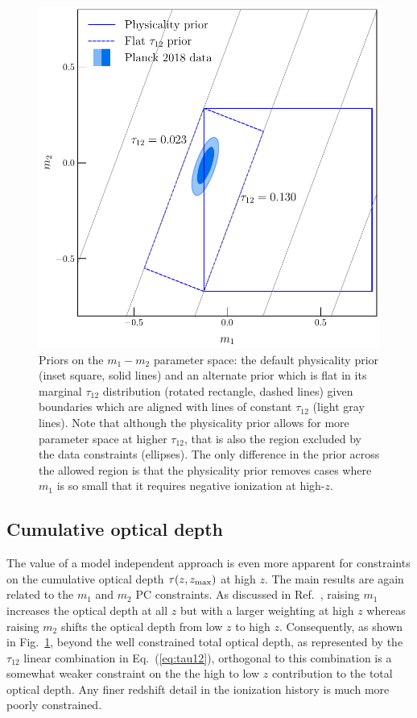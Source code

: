 \documentclass[prd,twocolumn,amsmath,amssymb,floatfix,superscriptaddress,nofootinbib]{revtex4-1}
\newcommand{\zmax}{z_{\rm max}}
\begin{document}
{ \begin{figure}
          \includegraphics[width=0.9\columnwidth]{paper/plots/pl18_pc_zmax30_pliklite_srollv2_1015_plot_rotated_box_flat_tau12.pdf}
          \caption {Priors on the $m_1-m_2$ parameter space: the default physicality prior (inset square, solid lines) and an alternate prior which is  flat in its marginal
           $\tau_{12}$ distribution (rotated rectangle, dashed lines) given boundaries
           which are aligned with lines of constant $\tau_{12}$ (light gray lines). Note that although the physicality prior allows for more parameter space at higher $\tau_{12}$, that is also the region excluded by the data constraints (ellipses). The only difference in the prior across the allowed region is that the physicality prior removes cases where $m_1$ is so small that it requires negative ionization at high-$z$.} 
          \label{fig:prior_box}
\end{figure}


%
%
%
\subsection{Cumulative optical depth}

The value of a model independent approach is even more apparent for constraints on the
cumulative optical depth $\tau(z, \zmax)$ at high $z$.
The main results are again related to the $m_1$ and $m_2$ PC constraints. 
As discussed in Ref.~\cite{Heinrich:2016ojb}, raising $m_1$ increases the  optical depth  at all $z$ but with a larger weighting at high $z$ whereas
raising $m_2$ shifts the optical depth from low $z$ to high $z$.  
Consequently, as shown in Fig.~\ref{fig:prior_box}, beyond the well constrained total optical depth, as represented by the $\tau_{12}$ linear combination in Eq.~(\ref{eq:tau12}), orthogonal to this combination is a somewhat weaker constraint on the the high to low $z$ 
contribution to the total optical depth.  Any finer redshift detail in the ionization history is much more poorly constrained.

}
\end{document}
